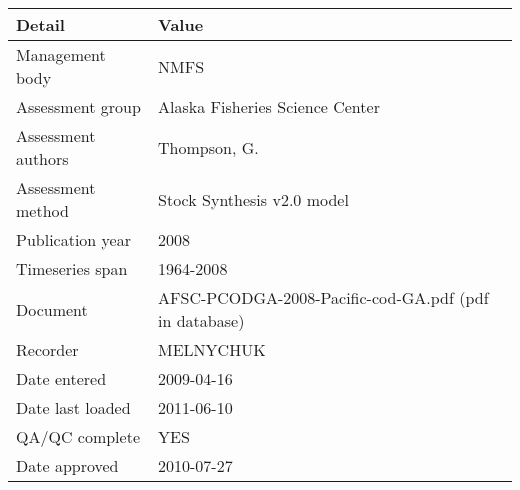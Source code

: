 \begin{table}[htb]
\centering
\begin{tabular}{lp{7cm}}
\toprule
Detail & Value \\
\midrule
Management body    & NMFS                                                  \\
Assessment group   & Alaska Fisheries Science Center                       \\
Assessment authors & Thompson, G.                                          \\
Assessment method  & Stock Synthesis v2.0 model                            \\
Publication year   & 2008                                                  \\
Timeseries span    & 1964-2008                                             \\
Document           & AFSC-PCODGA-2008-Pacific-cod-GA.pdf (pdf in database) \\
Recorder           & MELNYCHUK                                             \\
Date entered       & 2009-04-16                                            \\
Date last loaded   & 2011-06-10                                            \\
QA/QC complete     & YES                                                   \\
Date approved      & 2010-07-27                                            \\
\bottomrule
\end{tabular}
\label{tab:assessdet}
\end{table}
